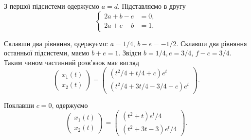 \begin{solution}
	З першої підсистеми одержуємо $a = d$. Підставляємо в другу
	\begin{equation*}
		\left\{
			\begin{aligned}
				2 a + b - e&= 0, \\
				2 a + e - b &= 1,
			\end{aligned}
		\right.
	\end{equation*}

	Склавши два рівняння, одержуємо: $a = 1 / 4$, $b - e = - 1 / 2$. Склавши два рівняння останньої підсистеми, маємо $b + e = 1$. Звідси  $b = 1 / 4, e = 3 / 4$, $f - c = 3 / 4$. Таким чином частинний розв'язок має вигляд
	\begin{equation*}
		\begin{pmatrix} x_1(t) \\ x_2(t) \end{pmatrix} = \begin{pmatrix} (t^2 / 4 + t / 4 + c) e^t \\ (t^2 / 4 + 3 t / 4 - 3 / 4 + c) e^t \end{pmatrix}.
	\end{equation*}

	Поклавши $c = 0$, одержуємо
	\begin{equation*}
		\begin{pmatrix} x_1(t) \\ x_2(t) \end{pmatrix} = \begin{pmatrix} (t^2 + t) e^t / 4 \\ (t^2 + 3 t - 3) e^t / 4 \end{pmatrix}.
	\end{equation*}
\end{solution}

